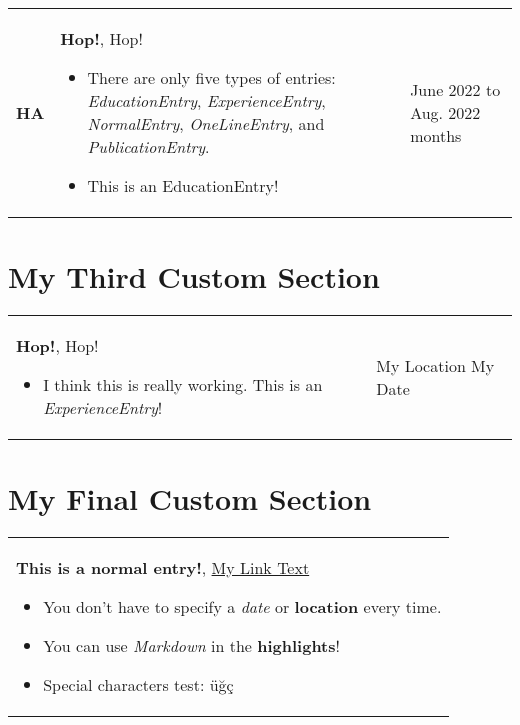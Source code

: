 \documentclass[10pt, a4paper]{article}
\newenvironment{highlights}{
        \begin{itemize}[
                topsep=0pt,
                parsep=0.07 cm,
                partopsep=0pt,
                itemsep=0pt,
                after=\vspace*{-1\baselineskip},
                leftmargin=0.6 cm + 3pt
            ]
    }{
        \end{itemize}
    } %
\let\hrefWithoutArrow\href
\renewcommand{\href}[2]{\hrefWithoutArrow{#1}{#2 \raisebox{.15ex}{\footnotesize \faExternalLink*}}}
\begin{document}
        \begin{tabularx}{ cm-0.13cm}{L{0.85cm} K{0.2 cm} R{3.6 cm}}
            \textbf{HA}
            & 
            \textbf{Hop!}, Hop!
            \vspace*{0.12 cm}
            \begin{highlights}
                \item There are only five types of entries: \textit{EducationEntry}, \textit{ExperienceEntry}, \textit{NormalEntry}, \textit{OneLineEntry}, and \textit{PublicationEntry}. 
                \item This is an EducationEntry! \hspace*{-0.2cm}
            \end{highlights}
        &
            June 2022 to Aug. 2022  months
        \end{tabularx}



    \section{My Third Custom Section}
    
        \begin{tabularx}{ cm-0.13cm}{K{0.2 cm} R{3.6 cm}}
            \textbf{Hop!}, Hop!
            \vspace*{0.12 cm}
            \begin{highlights}
                \item I think this is really working. This is an \textit{ExperienceEntry}! \hspace*{-0.2cm}
            \end{highlights}
        &
            My Location \newline
            My Date
        \end{tabularx}



    \section{My Final Custom Section}
    
        \begin{tabularx}{ cm-0.13cm}{K{0.2 cm}}
            \textbf{This is a normal entry!}, \href{https://example.com/}{My Link Text}
            \vspace*{0.12 cm}
            \begin{highlights}
                \item You don't have to specify a \textit{date} or \textbf{location} every time. 
                \item You can use \textit{Markdown} in the \textbf{highlights}! 
                \item Special characters test: üğç \hspace*{-0.2cm}
            \end{highlights}
        \end{tabularx}
\end{document}
